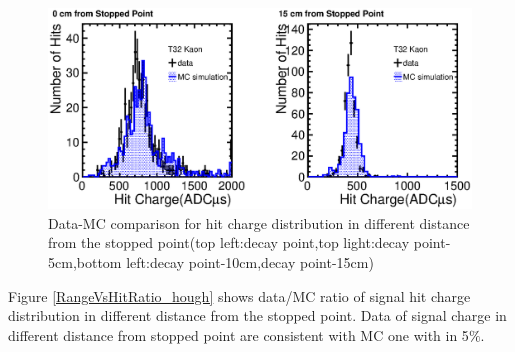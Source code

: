 \begin{figure}[!htb]
  \begin{center}
    \includegraphics[width=1.0\hsize]{fig/Kaon2.eps}
  \end{center}
  \caption{Data-MC comparison for hit charge distribution in different distance from the stopped point(top left:decay point,top light:decay point-5cm,bottom left:decay point-10cm,decay point-15cm)}
  \label{RangeVsHit_hough}
\end{figure}

Figure \ref{RangeVsHitRatio_hough} shows data/MC ratio of signal hit charge distribution in different distance from the stopped point.
Data of signal charge in different distance from stopped point are consistent with MC one with in 5$\%$.





